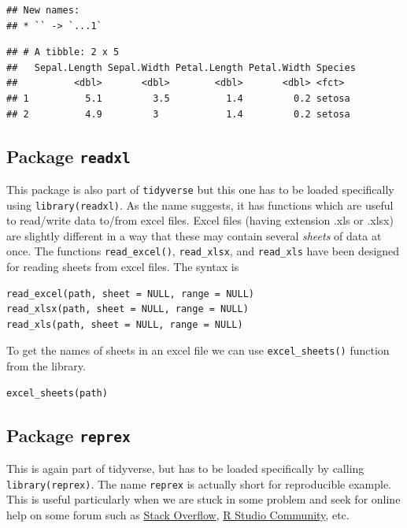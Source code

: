 \documentclass[
]{book}
\begin{document}
\begin{verbatim}
## New names:
## * `` -> `...1`
\end{verbatim}

\begin{verbatim}
## # A tibble: 2 x 5
##   Sepal.Length Sepal.Width Petal.Length Petal.Width Species
##          <dbl>       <dbl>        <dbl>       <dbl> <fct>  
## 1          5.1         3.5          1.4         0.2 setosa 
## 2          4.9         3            1.4         0.2 setosa
\end{verbatim}

\hypertarget{package-readxl}{%
\subsection{\texorpdfstring{Package \texttt{readxl}}{Package readxl}}\label{package-readxl}}

This package is also part of \texttt{tidyverse} but this one has to be loaded specifically using \texttt{library(readxl)}. As the name suggests, it has functions which are useful to read/write data to/from excel files. Excel files (having extension .xls or .xlsx) are slightly different in a way that these may contain several \emph{sheets} of data at once. The functions \texttt{read\_excel()}, \texttt{read\_xlsx}, and \texttt{read\_xls} have been designed for reading sheets from excel files. The syntax is

\begin{verbatim}
read_excel(path, sheet = NULL, range = NULL)
read_xlsx(path, sheet = NULL, range = NULL)
read_xls(path, sheet = NULL, range = NULL)
\end{verbatim}

To get the names of sheets in an excel file we can use \texttt{excel\_sheets()} function from the library.

\begin{verbatim}
excel_sheets(path)
\end{verbatim}

\hypertarget{reprex}{%
\subsection{\texorpdfstring{Package \texttt{reprex}}{Package reprex}}\label{reprex}}

This is again part of tidyverse, but has to be loaded specifically by calling \texttt{library(reprex)}. The name \texttt{reprex} is actually short for reproducible example. This is useful particularly when we are stuck in some problem and seek for online help on some forum such as \href{https://stackoverflow.com/questions/5963269/how-to-make-a-great-r-reproducible-example}{Stack Overflow}, \href{https://community.rstudio.com}{R Studio Community}, etc.
\end{document}
